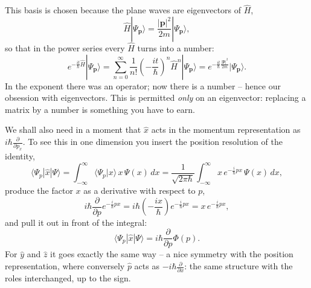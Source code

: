 This basis is chosen because the plane waves are eigenvectors of $\widehat{H}$,
\begin{equation}\label{eq:heigen}
	\widehat{H}|\Psi_{\mathbf{p}}\rangle = \frac{|\mathbf{p}|^2}{2m}|\Psi_{\mathbf{p}}\rangle,
\end{equation}
so that in the power series every $\widehat{H}$ turns into a number:
\begin{equation}
	e^{-\frac{it}{\hbar}\widehat{H}}|\Psi_{\mathbf{p}}\rangle = \sum_{n=0}^{\infty}\frac{1}{n!}\left(-\frac{it}{\hbar}\right)^n \widehat{H}^n|\Psi_{\mathbf{p}}\rangle = e^{-\frac{it}{\hbar}\frac{|\mathbf{p}|^2}{2m}}|\Psi_{\mathbf{p}}\rangle.
\end{equation}
In the exponent there was an operator; now there is a number -- hence our obsession with eigenvectors. This is permitted \emph{only} on an eigenvector: replacing a matrix by a number is something you have to earn.

We shall also need in a moment that $\widehat{x}$ acts in the momentum representation as $i\hbar\frac{\partial}{\partial p_x}$. To see this in one dimension you insert the position resolution of the identity,
\begin{equation}
	\langle \Psi_p|\widehat{x}|\Psi\rangle = \int_{-\infty}^\infty \langle \Psi_p|x\rangle\, x\, \Psi(x)\,dx = \frac{1}{\sqrt{2\pi\hbar}}\int_{-\infty}^\infty x\, e^{-\frac{i}{\hbar}px}\,\Psi(x)\,dx,
\end{equation}
produce the factor $x$ as a derivative with respect to $p$,
\begin{equation}
	i\hbar\frac{\partial}{\partial p}e^{-\frac{i}{\hbar}px} = i\hbar\left(-\frac{ix}{\hbar}\right)e^{-\frac{i}{\hbar}px} = x\,e^{-\frac{i}{\hbar}px},
\end{equation}
and pull it out in front of the integral:
\begin{equation}\label{eq:xinp}
	\langle \Psi_p|\widehat{x}|\Psi\rangle = i\hbar\frac{\partial}{\partial p}\Phi(p).
\end{equation}
For $\widehat{y}$ and $\widehat{z}$ it goes exactly the same way -- a nice symmetry with the position representation, where conversely $\widehat{p}$ acts as $-i\hbar\frac{\partial}{\partial x}$: the same structure with the roles interchanged, up to the sign.


